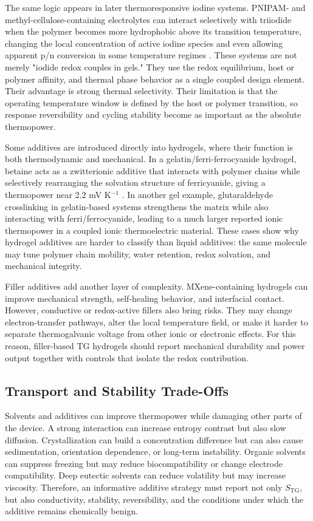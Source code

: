 \documentclass[a4paper,12pt]{report}
\begin{document}
The same logic appears in later thermoresponsive iodine systems. PNIPAM- and
methyl-cellulose-containing electrolytes can interact selectively with
triiodide when the polymer becomes more hydrophobic above its transition
temperature, changing the local concentration of active iodine species and even
allowing apparent p/n conversion in some temperature regimes
\citep{duan2019pn}. These systems are not merely "iodide redox couples in
gels." They use the redox equilibrium, host or polymer affinity, and thermal
phase behavior as a single coupled design element. Their advantage is strong
thermal selectivity. Their limitation is that the operating temperature window is
defined by the host or polymer transition, so response reversibility and
cycling stability become as important as the absolute thermopower.

Some additives are introduced directly into hydrogels, where their function is
both thermodynamic and mechanical. In a gelatin/ferri-ferrocyanide hydrogel,
betaine acts as a zwitterionic additive that interacts
with polymer chains while selectively rearranging the solvation structure of
ferricyanide, giving a thermopower near 2.2 mV K$^{-1}$
\citep{lu2024zwitterion}. In another gel example, glutaraldehyde crosslinking in
gelatin-based systems strengthens the matrix while also interacting with
ferri/ferrocyanide, leading to a much larger reported ionic thermopower in a
coupled ionic thermoelectric material. These cases
show why hydrogel additives are harder to classify than liquid additives: the
same molecule may tune polymer chain mobility, water retention, redox
solvation, and mechanical integrity.

Filler additives add another layer of complexity. MXene-containing hydrogels can
improve mechanical strength, self-healing behavior, and interfacial contact.
However, conductive or redox-active fillers also bring
risks. They may change electron-transfer pathways, alter the local temperature
field, or make it harder to separate thermogalvanic voltage from other ionic or
electronic effects. For this reason, filler-based TG hydrogels should report
mechanical durability and power output together with controls that isolate the
redox contribution.

\subsection{Transport and Stability Trade-Offs}

Solvents and additives can improve thermopower while damaging other parts of
the device. A strong interaction can increase entropy contrast but also slow
diffusion. Crystallization can build a concentration difference but can also
cause sedimentation, orientation dependence, or long-term instability. Organic
solvents can suppress freezing but may reduce biocompatibility or change
electrode compatibility. Deep eutectic solvents can reduce volatility but may
increase viscosity. Therefore, an informative additive strategy must report not only
$S_{\mathrm{TG}}$, but also conductivity, stability, reversibility, and the
conditions under which the additive remains chemically benign.
\end{document}
